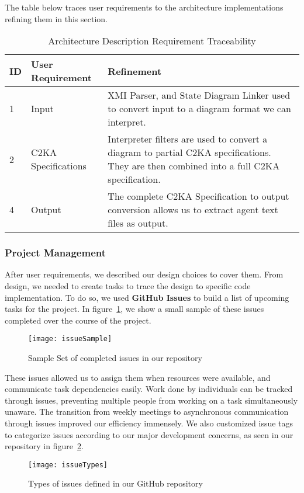 The table below traces user requirements to the architecture implementations refining them in this section.
\begin{table}[htbp]
    \centering
    \caption{Architecture Description Requirement Traceability}\label{tab:arch-description-table}
    \begin{tabularx}{\textwidth}{| l | l | X |}
        \hline
        \textbf{ID} & \textbf{User Requirement} & \textbf{Refinement} \\
        \hline
        1 & Input & XMI Parser, and State Diagram Linker used to convert input to a diagram format we can interpret. \\ \hline
        2 & C2KA Specifications & Interpreter filters are used to convert a diagram to partial C2KA specifications.
        They are then combined into a full C2KA specification. \\ \hline
        4 & Output & The complete C2KA Specification to output conversion allows us to extract agent text files as output.  \\ \hline
    \end{tabularx}
\end{table}

\newpage
\subsubsection{Project Management}\label{subsubsec:proj-mngmnt}
After user requirements, we described our design choices to cover them.
From design, we needed to create tasks to trace the design to specific code implementation.
To do so, we used \textbf{GitHub Issues} to build a list of upcoming tasks for the project.
In figure~\ref{fig:sampleIssueList}, we show a small sample of these issues completed over the course of the project.
\begin{figure}[h]
    \centering
    \texttt{[image: issueSample]}
    \caption{Sample Set of completed issues in our repository}
    \label{fig:sampleIssueList}
\end{figure}

These issues allowed us to assign them when resources were available, and communicate task dependencies easily.
Work done by individuals can be tracked through issues,
preventing multiple people from working on a task simultaneously unaware.
The transition from weekly meetings to asynchronous communication through issues improved our efficiency immensely.
We also customized issue tags to categorize issues
according to our major development concerns, as seen in our repository in figure~\ref{fig:issueTypes}.
\begin{figure}[h]
    \centering
    \texttt{[image: issueTypes]}
    \caption{Types of issues defined in our GitHub repository}
    \label{fig:issueTypes}
\end{figure}


